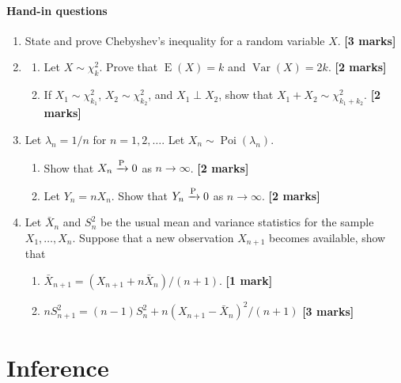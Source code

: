\documentclass[
]{book}
\DeclareMathOperator{\E}{E}
\DeclareMathOperator{\Var}{Var}
\DeclareMathOperator{\Pois}{Poi}
\theoremstyle{definition}
\theoremstyle{definition}
\theoremstyle{definition}
\theoremstyle{definition}
\theoremstyle{remark}
\begin{document}
\hypertarget{hand-in-questions-2}{%
\subsection*{Hand-in questions}\label{hand-in-questions-2}}

\begin{enumerate}
\def\labelenumi{\arabic{enumi}.}
\item
  State and prove Chebyshev's inequality for a random variable \(X\). \textbf{{[}3 marks{]}}
\item
  \begin{enumerate}
  \def\labelenumii{(\alph{enumii})}
  \item
    Let \(X\sim\chi^2_k\). Prove that \(\E(X) = k\) and \(\Var(X)=2k\). \textbf{{[}2 marks{]}}
  \item
    If \(X_1\sim\chi^2_{k_1}\), \(X_2\sim\chi^2_{k_2}\), and \(X_1 \perp X_2\), show that \(X_1+X_2 \sim \chi^2_{k_1+k_2}\). \textbf{{[}2 marks{]}}
  \end{enumerate}
\item
  Let \(\lambda_n=1/n\) for \(n=1,2,\dots\). Let \(X_n\sim\Pois(\lambda_n)\).

  \begin{enumerate}
  \def\labelenumii{(\alph{enumii})}
  \item
    Show that \(X_n\xrightarrow{\text P}0\) as \(n\to\infty\). \textbf{{[}2 marks{]}}
  \item
    Let \(Y_n=nX_n\). Show that \(Y_n\xrightarrow{\text P}0\) as \(n\to\infty\). \textbf{{[}2 marks{]}}
  \end{enumerate}
\item
  Let \(\bar X_n\) and \(S_n^2\) be the usual mean and variance statistics for the sample \(X_1,\dots,X_n\). Suppose that a new observation \(X_{n+1}\) becomes available, show that

  \begin{enumerate}
  \def\labelenumii{(\alph{enumii})}
  \item
    \(\bar X_{n+1}=(X_{n+1} + n\bar X_n) / (n+1)\). \textbf{{[}1 mark{]}}
  \item
    \(nS_{n+1}^2=(n-1)S_n^2 + n(X_{n+1}-\bar X_n)^2 / (n+1)\) \textbf{{[}3 marks{]}}
  \end{enumerate}
\end{enumerate}

\hypertarget{part-inference}{%
\part{Inference}\label{part-inference}}
\end{document}
